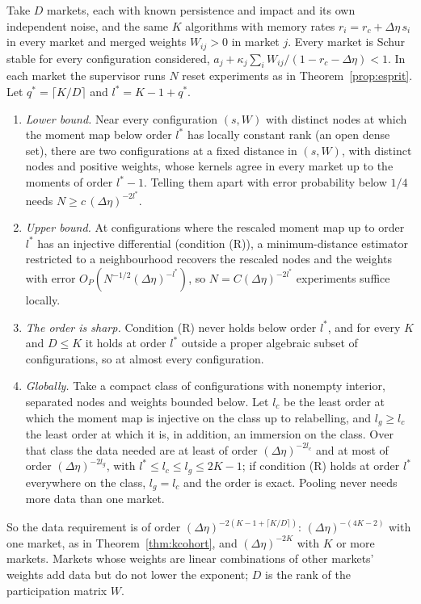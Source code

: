 Take $D$ markets, each with known persistence and impact and its own independent noise, and the same $K$ algorithms with memory rates $r_i=r_c+\Delta\eta\,s_i$ in every market and merged weights $W_{ij}>0$ in market $j$. Every market is Schur stable for every configuration considered, $a_j+\kappa_j\sum_iW_{ij}/(1-r_c-\Delta\eta)<1$. In each market the supervisor runs $N$ reset experiments as in Theorem~\ref{prop:esprit}. Let $q^*=\lceil K/D\rceil$ and $l^*=K-1+q^*$.

\begin{theorem}\label{thm:pool}
\begin{enumerate}[label=(\roman*),itemsep=1pt]
\item \emph{Lower bound.} Near every configuration $(s,W)$ with distinct nodes at which the moment map below order $l^*$ has locally constant rank (an open dense set), there are two configurations at a fixed distance in $(s,W)$, with distinct nodes and positive weights, whose kernels agree in every market up to the moments of order $l^*-1$. Telling them apart with error probability below $1/4$ needs $N\ge c\,(\Delta\eta)^{-2l^*}$.
\item \emph{Upper bound.} At configurations where the rescaled moment map up to order $l^*$ has an injective differential (condition (R)), a minimum-distance estimator restricted to a neighbourhood recovers the rescaled nodes and the weights with error $O_P(N^{-1/2}(\Delta\eta)^{-l^*})$, so $N=C(\Delta\eta)^{-2l^*}$ experiments suffice locally.
\item \emph{The order is sharp.} Condition (R) never holds below order $l^*$, and for every $K$ and $D\le K$ it holds at order $l^*$ outside a proper algebraic subset of configurations, so at almost every configuration.
\item \emph{Globally.} Take a compact class of configurations with nonempty interior, separated nodes and weights bounded below. Let $l_c$ be the least order at which the moment map is injective on the class up to relabelling, and $l_g\ge l_c$ the least order at which it is, in addition, an immersion on the class. Over that class the data needed are at least of order $(\Delta\eta)^{-2l_c}$ and at most of order $(\Delta\eta)^{-2l_g}$, with $l^*\le l_c\le l_g\le2K-1$; if condition (R) holds at order $l^*$ everywhere on the class, $l_g=l_c$ and the order is exact. Pooling never needs more data than one market.
\end{enumerate}
So the data requirement is of order $(\Delta\eta)^{-2(K-1+\lceil K/D\rceil)}$: $(\Delta\eta)^{-(4K-2)}$ with one market, as in Theorem~\ref{thm:kcohort}, and $(\Delta\eta)^{-2K}$ with $K$ or more markets. Markets whose weights are linear combinations of other markets' weights add data but do not lower the exponent; $D$ is the rank of the participation matrix $W$.
\end{theorem}

